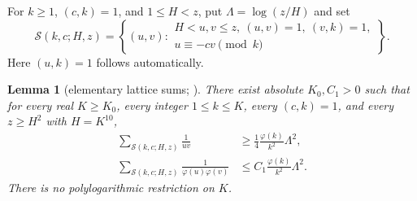 \documentclass[10pt,reqno]{amsart}
\newtheorem{lemma}[theorem]{Lemma}
\theoremstyle{remark}
\newcommand{\Sset}{\mathcal S}
\begin{document}
For $k\geq1$, $(c,k)=1$, and $1\leq H<z$, put $\Lambda=\log(z/H)$ and set
\[
 \Sset(k,c;H,z)=\left\{(u,v):\begin{array}{l}
 H<u,v\leq z,\ (u,v)=1,\ (v,k)=1,\\
 u\equiv-cv\pmod k
 \end{array}\right\}.
\]
Here $(u,k)=1$ follows automatically.

\begin{lemma}[elementary lattice sums; {\cite[Lemma 3.1]{LL}}]\label{lem:lattice}
There exist absolute $K_0,C_1>0$ such that for every real $K\geq K_0$,
every integer $1\leq k\leq K$, every $(c,k)=1$, and every $z\geq H^2$
with $H=K^{10}$,
\begin{align}
 \sum_{\Sset(k,c;H,z)}\frac1{uv}
 &\geq\frac14\frac{\varphi(k)}{k^2}\Lambda^2,\label{eq:latlower}\\
 \sum_{\Sset(k,c;H,z)}\frac1{\varphi(u)\varphi(v)}
 &\leq C_1\frac{\varphi(k)}{k^2}\Lambda^2.\label{eq:latupper}
\end{align}
There is no polylogarithmic restriction on $K$.
\end{lemma}
\end{document}
